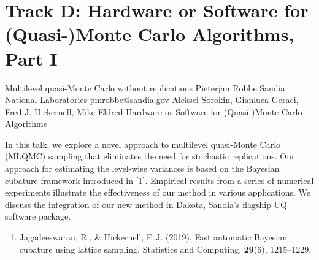 \section{Track D: Hardware or Software for (Quasi-)Monte Carlo Algorithms, Part I}\newpage

\begin{talk}
  {Multilevel quasi-Monte Carlo without replications}%
  {Pieterjan Robbe}%
  {Sandia National Laboratories}%
  {pmrobbe@sandia.gov}%
  {Aleksei Sorokin, Gianluca Geraci, Fred J. Hickernell, Mike Eldred}%
  {Hardware or Software for (Quasi-)Monte Carlo Algorithms}%
    
   
In this talk, we explore a novel approach to multilevel quasi-Monte Carlo (MLQMC) sampling that eliminates the need for stochastic replications. Our approach for estimating the level-wise variances is based on the Bayesian cubature framework introduced in [1]. Empirical results from a series of numerical experiments illustrate the effectiveness of our method in various applications. We discuss the integration of our new method in Dakota, Sandia's flagship UQ software package.

\medskip

\begin{enumerate}
  \item[{[1]}] Jagadeeswaran, R., \& Hickernell, F.\,J. (2019). Fast automatic Bayesian cubature using lattice sampling. Statistics and Computing, \textbf{29}(6), 1215--1229.
\end{enumerate}

\end{talk}

